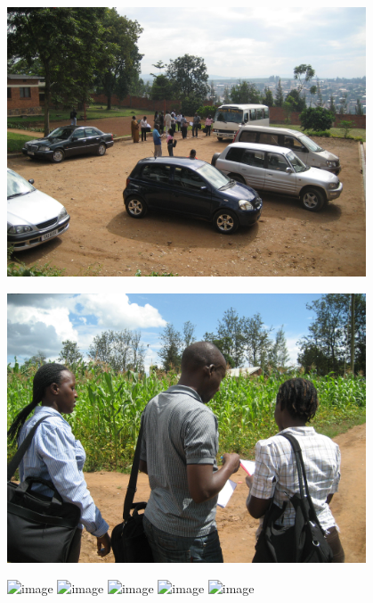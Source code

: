 \documentclass[aspectratio=169]{beamer}
\begin{document}
\begin{frame}

\begin{center}
\includegraphics[width=0.8\textwidth]{figures/rwanda_interviewer_bus.jpg}
\end{center}

\end{frame}
\begin{frame}

\begin{center}
\includegraphics[width=0.8\textwidth]{figures/rwanda_fieldwork.jpg}
\end{center}

\end{frame}
\begin{frame}

\begin{center}
\includegraphics<1>[width=0.7\textwidth]{figures/tie_strength_axes}
\includegraphics<2>[width=0.7\textwidth]{figures/tie_strength_sampling}
\includegraphics<3>[width=0.7\textwidth]{figures/tie_strength_sampling_non_sampling}
\includegraphics<4>[width=0.7\textwidth]{figures/tie_strength_sampling_non_sampling_total}
\includegraphics<5>[width=0.7\textwidth]{figures/tie_strength_total}
\end{center}


\end{frame}
\end{document}
